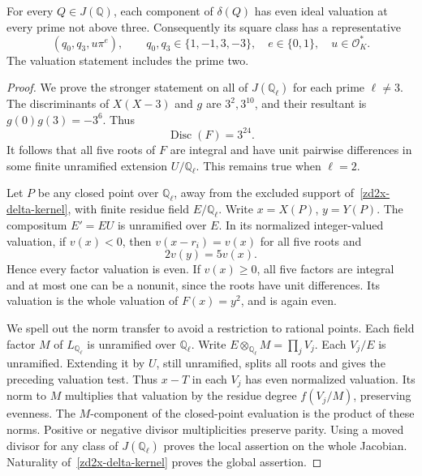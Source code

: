 \begin{lemma}
\label{zd2x-even-valuations}
For every \(Q\in J(\mathbb Q)\), each component of \(\delta(Q)\)
has even ideal valuation at every prime not above three.
Consequently its square class has a representative
\begin{equation}
 (q_0,q_3,u\pi^e),\qquad
 q_0,q_3\in\{1,-1,3,-3\},\quad
 e\in\{0,1\},\quad u\in\mathcal O_K^* .
 \label{zd2x-global-classes}
\end{equation}
The valuation statement includes the prime two.
\end{lemma}
\begin{proof}
We prove the stronger statement on all of \(J(\mathbb Q_\ell)\)
for each prime \(\ell\ne3\). The discriminants of \(X(X-3)\)
and \(g\) are \(3^2,3^{10}\), and their resultant is
\(g(0)g(3)=-3^6\). Thus
\[
 \operatorname{Disc}(F)=3^{24}.
\]
It follows that all five roots of \(F\) are integral and have
unit pairwise differences in some finite unramified extension
\(U/\mathbb Q_\ell\). This remains true when \(\ell=2\).

Let \(P\) be any closed point over \(\mathbb Q_\ell\), away
from the excluded support of~\eqref{zd2x-delta-kernel}, with
finite residue field \(E/\mathbb Q_\ell\). Write \(x=X(P)\),
\(y=Y(P)\). The compositum \(E'=EU\) is unramified over \(E\).
In its normalized integer-valued valuation, if \(v(x)<0\),
then \(v(x-r_i)=v(x)\) for all five roots and
\[
 2v(y)=5v(x).
\]
Hence every factor valuation is even. If \(v(x)\ge0\), all
five factors are integral and at most one can be a nonunit,
since the roots have unit differences. Its valuation is the
whole valuation of \(F(x)=y^2\), and is again even.

We spell out the norm transfer to avoid a restriction to
rational points. Each field factor \(M\) of \(L_{\mathbb Q_\ell}\)
is unramified over \(\mathbb Q_\ell\). Write
\(E\otimes_{\mathbb Q_\ell}M=\prod_j V_j\).
Each \(V_j/E\) is unramified. Extending it by \(U\), still
unramified, splits all roots and gives the preceding valuation
test. Thus \(x-T\) in each \(V_j\) has even normalized valuation.
Its norm to \(M\) multiplies that valuation by the residue
degree \(f(V_j/M)\), preserving evenness. The \(M\)-component
of the closed-point evaluation is the product of these norms.
Positive or negative divisor multiplicities preserve parity.
Using a moved divisor for any class of \(J(\mathbb Q_\ell)\)
proves the local assertion on the whole Jacobian. Naturality
of~\eqref{zd2x-delta-kernel} proves the global assertion.


\end{proof}
